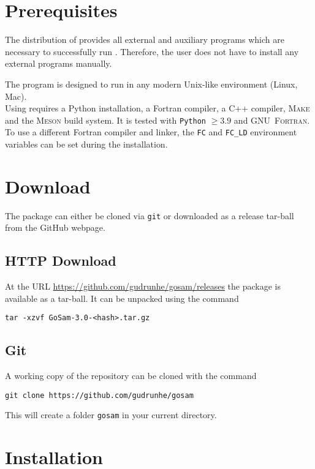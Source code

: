 \section{Prerequisites}

The distribution of \gosamv provides all external and auxiliary programs which are necessary
to successfully run \gosam.
Therefore, the user does not have to install any external programs manually.

The program \gosam is designed to run in any modern Unix-like environment (Linux, Mac).\\
Using \gosam requires a Python installation, a Fortran compiler, a C++ compiler, \textsc{Make} and the \textsc{Meson} build system. It is tested with \texttt{Python} $\geq 3.9$ and \textsc{GNU~Fortran}.
To use a different Fortran compiler and linker, the \texttt{FC} and \texttt{FC\_LD} environment variables can
be set during the installation.


\section{Download}

The \gosamv package can either be cloned
via \texttt{git}
or downloaded as a release tar-ball from the GitHub webpage.

\subsection*{HTTP Download}
At the URL \url{https://github.com/gudrunhe/gosam/releases} the package
\gosamv is available as a tar-ball.
It can be unpacked using the command
\begin{lstlisting}[style=sh]
tar -xzvf GoSam-3.0-<hash>.tar.gz
\end{lstlisting}

\subsection*{Git}
A working copy of the repository can be cloned with the command
\begin{lstlisting}[style=sh]
git clone https://github.com/gudrunhe/gosam
\end{lstlisting}
This will create a folder \texttt{gosam} in your current directory.

\section{Installation}

